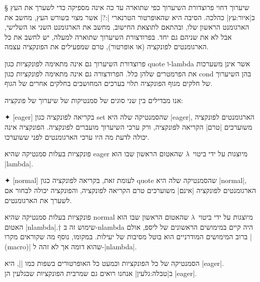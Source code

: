 \documentclass[a4paper,12pt,reqno]{article}
\begin{document}
§ שיערוך דחוי  
פרוצדורת השיערוך כפי שתוארה עד כה אינה מספיקה כדי לשערך את העץ ב|איור:עץ|
כהלכה. הסיבה היא שהאופרטור הטרנארי \T|:?| אשר מצוי בשורש העץ, מחשב את הארגומנט
הראשון שלו, ובהתאם לתוצאת החישוב, מחשב את הארגומנט השני או השלישי, אבל לא את
שניהם גם יחד. בפרודצורת השיערוך שתוארה למעלה, יש לחשב את כל הארגומנטים לפונקציה
(או אופרטור), טרם שמפעילים את הפונקציה עצמה.

פרוצדורת השיערוך גם אינה מתאימה לפונקציות כגון quote ו-lambda אשר אינן משערכות
את הפרמטרים שלהן כלל. הפרודצורה גם אינה מתאימה לפונקציות כגון cond בהן השיערוך
של חלקים מגוף הפונקציה תלוי בערכים המחושבים בחלקים אחרים של הגוף.

אנו מבדילים בין שני סוגים של סמנטיקות של שיערוך של פונקציה:
\begin{description}
  ✦ [eager] בקריאה לפונקציה כגון set שהסמנטיקה שלה היא \E|eager|, הארגומנטים
  לפונקציה משוערכים \ע|טרם| הקריאה לפונקציה, ורק ערכי השיערוך מועברים לפונקציה.
  הפונקציה אינה יכולה לדעת מה היו ערכי הארגומנטים לפני ששוערכו.

  פונקציות בעלות סמנטיקה שהיא eager מיוצגות על ידי ביטוי~$λ$ שהאטום הראשון שבו
  הוא \T|lambda|.

  ✦ [normal] לעומת זאת, בקריאה לפונקציה כגון quote שהסמנטיקה שלה היא
  \E|normal|, הארגומנטים לפונקציה \ע|אינם| משוערכים טרם הקריאה לפונקציה,
  והפונקציה יכולה לבחור אם לשערך את הארגומנטים.

  פונקציות בעלות סמנטיקה שהיא normal מיוצגות על ידי ביטוי~$λ$ שהאטום הראשון שבו
  הוא האטום \T|nlambda|.†{
  שימוש זה ב-nlambda היה קיים במימושים הראשונים של ליספ, אולם ברוב המימושים המודרניים
  הוא בוטל מסיבות של יעילות. במקומו, נוסף מה שקוראים מקרו \E|(macro)|
  שהוא דומה אך לא זהה ל-\E|nlambda|.}

\end{description}

הסמנטיקה של כל הפונקציות וכמעט כל האופרטורים בשפות כמו \E|\CPL|, היא \E|eager|.
ב|טבלה:גלעין| אנחנו רואים גם שמרבית הפונקציות שבגלעין הן \E|eager|.
\end{document}
